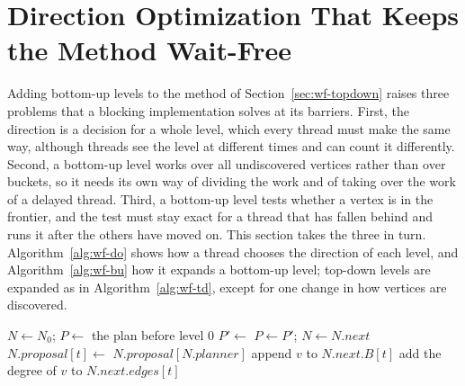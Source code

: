 \section{Direction Optimization That Keeps the Method Wait-Free}
\label{sec:dir-opt}

Adding bottom-up levels to the method of Section~\ref{sec:wf-topdown} raises three problems that a blocking implementation solves at its barriers. First, the direction is a decision for a whole level, which every thread must make the same way, although threads see the level at different times and can count it differently. Second, a bottom-up level works over all undiscovered vertices rather than over buckets, so it needs its own way of dividing the work and of taking over the work of a delayed thread. Third, a bottom-up level tests whether a vertex is in the frontier, and the test must stay exact for a thread that has fallen behind and runs it after the others have moved on. This section takes the three in turn. Algorithm~\ref{alg:wf-do} shows how a thread chooses the direction of each level, and Algorithm~\ref{alg:wf-bu} how it expands a bottom-up level; top-down levels are expanded as in Algorithm~\ref{alg:wf-td}, except for one change in how vertices are discovered.

\begin{algorithm}
\caption{Direction-optimizing BFS, as thread $t$ runs it. \textsc{ExpandLevel} and \textsc{AddLevel} are those of Algorithm~\ref{alg:wf-td}, with \textsc{Discover} in place of lines~\ref{ln:td-push} and~\ref{ln:td-dist}.}
\label{alg:wf-do}
\begin{algorithmic}[1]
    \State $N \gets N_0$; $P \gets$ the plan before level $0$
        \State $P' \gets$ 
            \State {}
        \Else
            \State {}
        \EndIf
        \State $P \gets P'$; $N \gets N.\mathit{next}$
    \EndWhile
\EndProcedure
\Statex
{}
        \State $N.\mathit{proposal}[t] \gets$  \label{ln:do-propose}
        \State {} \label{ln:do-claim}
    \EndIf
    \State \Return $N.\mathit{proposal}[N.\mathit{planner}]$ \label{ln:do-adopt}
\EndProcedure
\Statex
{} 
    \State append $v$ to $N.\mathit{next}.B[t]$
     \label{ln:do-cas}
        \State add the degree of $v$ to $N.\mathit{next}.\mathit{edges}[t]$
    \EndIf
\EndProcedure
\end{algorithmic}
\end{algorithm}

